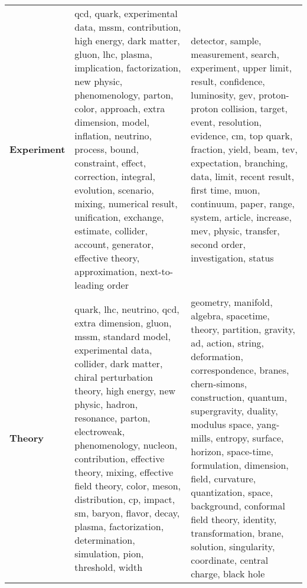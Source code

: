 \begin{longtable}{p{3cm}|p{5cm}|p{5cm}}
\bottomrule
\endlastfoot
\textbf{Experiment} &  qcd, quark, experimental data, mssm, contribution, high energy, dark matter, gluon, lhc, plasma, implication, factorization, new physic, phenomenology, parton, color, approach, extra dimension, model, inflation, neutrino, process, bound, constraint, effect, correction, integral, evolution, scenario, mixing, numerical result, unification, exchange, estimate, collider, account, generator, effective theory, approximation, next-to-leading order &                                                            detector, sample, measurement, search, experiment, upper limit, result, confidence, luminosity, gev, proton-proton collision, target, event, resolution, evidence, cm, top quark, fraction, yield, beam, tev, expectation, branching, data, limit, recent result, first time, muon, continuum, paper, range, system, article, increase, mev, physic, transfer, second order, investigation, status \\
\textbf{Theory    } &           quark, lhc, neutrino, qcd, extra dimension, gluon, mssm, standard model, experimental data, collider, dark matter, chiral perturbation theory, high energy, new physic, hadron, resonance, parton, electroweak, phenomenology, nucleon, contribution, effective theory, mixing, effective field theory, color, meson, distribution, cp, impact, sm, baryon, flavor, decay, plasma, factorization, determination, simulation, pion, threshold, width &  geometry, manifold, algebra, spacetime, theory, partition, gravity, ad, action, string, deformation, correspondence, branes, chern-simons, construction, quantum, supergravity, duality, modulus space, yang-mills, entropy, surface, horizon, space-time, formulation, dimension, field, curvature, quantization, space, background, conformal field theory, identity, transformation, brane, solution, singularity, coordinate, central charge, black hole \\
\end{longtable}
